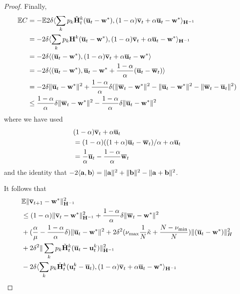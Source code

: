 \begin{proof}
	Finally, 
	\begin{align*}
	\mathbb{E}C & =-\mathbb{E}2\delta\langle\sum_{k}p_{k}\tilde{\vH}_{t}^{k}(\ov{u}_{t}-\vw^{\ast}),(1-\alpha)\ov{v}_{t}+\alpha\ov{u}_{t}-\vw^{\ast}\rangle_{\vH^{-1}}\\
	& =-2\delta\langle\sum_{k}p_{k}\vH^{k}(\ov{u}_{t}-\vw^{\ast}),(1-\alpha)\ov{v}_{t}+\alpha\ov{u}_{t}-\vw^{\ast}\rangle_{\vH^{-1}}\\
	& =-2\delta\langle(\ov{u}_{t}-\vw^{\ast}),(1-\alpha)\ov{v}_{t}+\alpha\ov{u}_{t}-\vw^{\ast}\rangle\\
	& =-2\delta\langle(\ov{u}_{t}-\vw^{\ast}),\ov{u}_{t}-\vw^{\ast}+\frac{1-\alpha}{\alpha}(\ov{u}_{t}-\ov{w}_{t})\rangle\\
	& =-2\delta\|\ov{u}_{t}-\vw^{\ast}\|^{2}+\frac{1-\alpha}{\alpha}\delta(\|\ov{w}_{t}-\vw^{\ast}\|^{2}-\|\ov{u}_{t}-\vw^{\ast}\|^{2}-\|\ov{w}_{t}-\ov{u}_{t}\|^{2})\\
	& \leq\frac{1-\alpha}{\alpha}\delta\|\ov{w}_{t}-\vw^{\ast}\|^{2}-\frac{1-\alpha}{\alpha}\delta\|\ov{u}_{t}-\vw^{\ast}\|^{2}
	\end{align*}
	where we have used 
	\begin{align*}
	& (1-\alpha)\ov{v}_{t}+\alpha\ov{u}_{t}\\
	& =(1-\alpha)((1+\alpha)\ov{u}_{t}-\ov{w}_{t})/\alpha+\alpha\ov{u}_{t}\\
	& =\frac{1}{\alpha}\ov{u}_{t}-\frac{1-\alpha}{\alpha}\ov{w}_{t}
	\end{align*}
	and the identity that $-2\langle \va,\vb\rangle=\|\va\|^{2}+\|\vb\|^{2}-\|\va+\vb\|^{2}$. 
	
	It follows that 
	\begin{align*}
	& \mathbb{E}\|\ov{v}_{t+1}-\vw^{\ast}\|_{\vH^{-1}}^{2}\\
	& \leq(1-\alpha)\|\ov{v}_{t}-\vw^{\ast}\|_{\vH^{-1}}^{2}+\frac{1-\alpha}{\alpha}\delta\|\ov{w}_{t}-\vw^{\ast}\|^{2}\\
	& +(\frac{\alpha}{\mu}-\frac{1-\alpha}{\alpha}\delta)\|\ov{u}_{t}-\vw^{\ast}\|^{2}+2\delta^{2}(\nu_{\max}\frac{1}{N}\tilde{\kappa}+\frac{N-\nu_{\min}}{N})\|(\ov{u}_{t}-\vw^{\ast})\|_{H}^{2}\\
	& +2\delta^{2}\|\sum_{k}p_{k}\tilde{\vH}_{t}^{k}(\ov{u}_{t}-\vu_{t}^{k})\|_{\vH^{-1}}^{2}\\
	& -2\delta\langle\sum_{k}p_{k}\tilde{\vH}_{t}^{k}(\vu_{t}^{k}-\ov{u}_{t}),(1-\alpha)\ov{v}_{t}+\alpha\ov{u}_{t}-\vw^{\ast}\rangle_{\vH^{-1}}
	\end{align*}
	

\end{proof}
